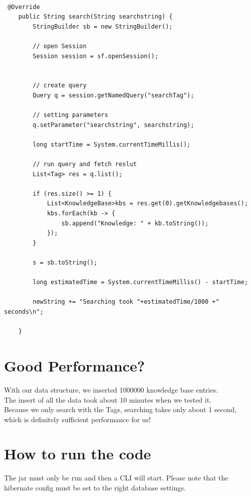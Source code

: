 \documentclass[12pt]{article}
\begin{document}
\begin{lstlisting}[caption=Search method of the Service, label=generateEntry]

 @Override
    public String search(String searchstring) {
        StringBuilder sb = new StringBuilder();

        // open Session
        Session session = sf.openSession();


        // create query
        Query q = session.getNamedQuery("searchTag");

        // setting parameters
        q.setParameter("searchstring", searchstring);

        long startTime = System.currentTimeMillis();

        // run query and fetch reslut
        List<Tag> res = q.list();

        if (res.size() >= 1) {
            List<KnowledgeBase>kbs = res.get(0).getKnowledgebases();
            kbs.forEach(kb -> {
                sb.append("Knowledge: " + kb.toString());
            });
        }
        
        s = sb.toString();

        long estimatedTime = System.currentTimeMillis() - startTime;

        newString += "Searching took "+estimatedTime/1000 +" seconds\n";

    }
    \end{lstlisting}
\section{Good Performance?}
With our data structure, we inserted 1000000 knowledge base entries. \\
The insert of all the data took about 10 minutes when we tested it.
\\
Because we only search with the Tags, searching takes only about 1 second, which is definitely sufficient performance for us! \\


\section{How to run the code}
The jar must only be run and then a CLI will start. Please note that the hibernate config must be set to the right database settings.
\end{document}
